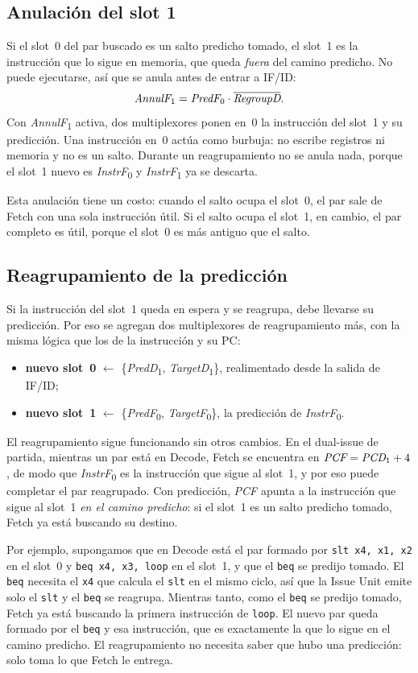 \documentclass[11pt,a4paper]{article}
\newcommand{\sig}[1]{\textit{#1}}
\newcommand{\sigk}[2]{\textit{#1}\textsubscript{#2}}
\newcommand{\ins}[1]{\texttt{#1}}
\begin{document}
\subsection{Anulación del slot 1}

Si el slot~0 del par buscado es un salto predicho tomado, el slot~1 es la instrucción que
lo sigue en memoria, que queda \emph{fuera} del camino predicho. No puede ejecutarse, así
que se anula antes de entrar a IF/ID:
\[
  \sigk{AnnulF}{1} = \sigk{PredF}{0}\cdot\overline{\sig{RegroupD}}.
\]
Con \sigk{AnnulF}{1} activa, dos multiplexores ponen en~0 la instrucción del slot~1 y su
predicción. Una instrucción en~0 actúa como burbuja: no escribe registros ni memoria y no
es un salto. Durante un reagrupamiento no se anula nada, porque el slot~1 nuevo es
\sigk{InstrF}{0} y \sigk{InstrF}{1} ya se descarta.

Esta anulación tiene un costo: cuando el salto ocupa el slot~0, el par sale de Fetch con una
sola instrucción útil. Si el salto ocupa el slot~1, en cambio, el par completo es útil,
porque el slot~0 es más antiguo que el salto.

\subsection{Reagrupamiento de la predicción}

Si la instrucción del slot~1 queda en espera y se reagrupa, debe llevarse su predicción. Por
eso se agregan dos multiplexores de reagrupamiento más, con la misma lógica que los de la
instrucción y su PC:
\begin{itemize}
  \item \textbf{nuevo slot~0} $\leftarrow$ \{\sigk{PredD}{1}, \sigk{TargetD}{1}\},
        realimentado desde la salida de IF/ID;
  \item \textbf{nuevo slot~1} $\leftarrow$ \{\sigk{PredF}{0}, \sigk{TargetF}{0}\}, la
        predicción de \sigk{InstrF}{0}.
\end{itemize}

El reagrupamiento sigue funcionando sin otros cambios. En el dual-issue de partida, mientras
un par está en Decode, Fetch se encuentra en $\sig{PCF} = \sigk{PCD}{1} + 4$, de modo que
\sigk{InstrF}{0} es la instrucción que sigue al slot~1, y por eso puede completar el par
reagrupado. Con predicción, \sig{PCF} apunta a la instrucción que sigue
al slot~1 \emph{en el camino predicho}: si el slot~1 es un salto predicho tomado, Fetch ya
está buscando su destino.

Por ejemplo, supongamos que en Decode está el par formado por \ins{slt x4, x1, x2} en el
slot~0 y \ins{beq x4, x3, loop} en el slot~1, y que el \ins{beq} se predijo tomado. El \ins{beq} necesita el \ins{x4} que calcula
el \ins{slt} en el mismo ciclo, así que la Issue Unit emite solo el \ins{slt} y el
\ins{beq} se reagrupa. Mientras tanto, como el \ins{beq} se predijo tomado, Fetch ya está
buscando la primera instrucción de \ins{loop}. El nuevo par queda formado por el \ins{beq}
y esa instrucción, que es exactamente la que lo sigue en el camino predicho. El
reagrupamiento no necesita saber que hubo una predicción: solo toma lo que Fetch le
entrega.
\end{document}
